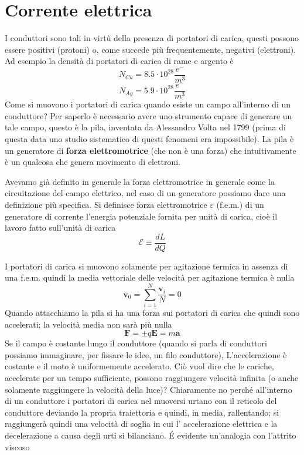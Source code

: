 \documentclass[
10pt, %
a4paper, %
oneside, %
headinclude,footinclude, %
BCOR5mm, %
]{scrartcl}
\begin{document}
\section{Corrente elettrica}
I conduttori sono tali in virtù della presenza di portatori di carica, questi possono essere positivi (protoni) o, come succede più frequentemente, negativi (elettroni). Ad esempio la densità di portatori di carica di rame e argento è
\[N_{Cu} = 8.5 \cdot 10^{28}\frac{e^-}{m^3}\]
\[N_{Ag} = 5.9\cdot 10^{28}\frac{e^-}{m^3}\]
Come si muovono i portatori di carica quando esiste un campo all'interno di un conduttore? Per saperlo è necessario avere uno strumento capace di generare un tale campo, questo è la pila, inventata da Alessandro Volta nel 1799 (prima di questa data uno studio sistematico di questi fenomeni era impossibile). La pila è un generatore di \textbf{forza elettromotrice} (che non è una forza) che intuitivamente è un qualcosa che genera movimento di elettroni.
\begin{definizione}
	Avevamo già definito in generale la forza elettromotrice in generale come la circuitazione del campo elettrico, nel caso di un generatore possiamo dare una definizione più specifica.
	Si definisce forza elettromotrice \(\varepsilon\) (f.e.m.) di un generatore di corrente l'energia potenziale fornita per unità di carica, cioè il lavoro fatto sull'unità di carica
	\[\mathcal{E} \equiv \frac{dL}{dQ}\]
\end{definizione}
I portatori di carica si muovono solamente per agitazione termica in assenza di una f.e.m. quindi la media vettoriale delle velocità per agitazione termica è nulla
\[\mathbf{\overline{v}}_0= \sum_{i = 1}^{N}\frac{\mathbf{v}_i}{N}=0\]
Quando attacchiamo la pila si ha una forza sui portatori di carica che quindi sono accelerati; la velocità media non sarà più nulla
\[\mathbf{F}= \pm q\mathbf{E}= m \mathbf{a}\]
Se il campo è costante lungo il conduttore (quando si parla di conduttori possiamo immaginare, per fissare le idee, un filo conduttore), L'accelerazione è costante e il moto è uniformemente accelerato. Ciò vuol dire che le cariche, accelerate per un tempo sufficiente, possono raggiungere velocità infinita (o anche solamente raggiungere la velocità della luce)? Chiaramente no perché all'interno di un conduttore i portatori di carica nel muoversi urtano con il reticolo del conduttore deviando la propria traiettoria e quindi, in media, rallentando; si raggiungerà quindi una velocità di soglia in cui l' accelerazione elettrica e la decelerazione a causa degli urti si bilanciano. \'E evidente un'analogia con l'attrito viscoso
\end{document}
